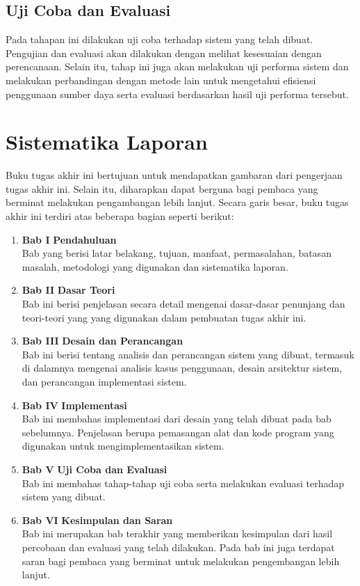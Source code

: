 \subsection{Uji Coba dan Evaluasi}
Pada tahapan ini dilakukan uji coba terhadap sistem yang telah dibuat. Pengujian dan evaluasi akan dilakukan dengan melihat kesesuaian dengan perencanaan. Selain itu, tahap ini juga akan melakukan uji performa sistem dan melakukan perbandingan dengan metode lain untuk mengetahui efisiensi penggunaan sumber daya serta evaluasi berdasarkan hasil uji performa tersebut. 

\section{Sistematika Laporan}
Buku tugas akhir ini bertujuan untuk mendapatkan gambaran dari pengerjaan tugas akhir ini. Selain itu, diharapkan dapat berguna bagi pembaca yang berminat melakukan pengambangan lebih lanjut. Secara garis besar, buku tugas akhir ini terdiri atas beberapa bagian seperti berikut:
\begin{enumerate}
	
	\item \textbf{Bab I} \indent \textbf{Pendahuluan} \\        
	\indent \indent Bab yang berisi latar belakang, tujuan, manfaat, permasalahan, batasan masalah, metodologi yang digunakan dan sistematika laporan.
	\\
	\item \textbf{Bab II} \indent \textbf{Dasar Teori}
	\\
	\indent \indent Bab ini berisi penjelasan secara detail mengenai dasar-dasar penunjang dan teori-teori yang yang digunakan dalam pembuatan tugas akhir ini.
	\\
	\item \textbf{Bab III} \indent \textbf{Desain dan Perancangan}
	\\
	\indent \indent Bab ini berisi tentang analisis dan perancangan sistem yang dibuat, termasuk di dalamnya mengenai analisis kasus penggunaan, desain arsitektur sistem, dan perancangan implementasi sistem.
	\\
	\item \textbf{Bab IV} \indent \textbf{Implementasi}
	\\
	\indent \indent Bab ini membahas implementasi dari desain yang telah dibuat pada bab sebelumnya. Penjelasan berupa pemasangan alat dan kode program yang digunakan untuk mengimplementasikan sistem.
	\\
	\item \textbf{Bab V} \indent \textbf{Uji Coba dan Evaluasi}
	\\
	\indent \indent Bab ini membahas tahap-tahap uji coba serta melakukan evaluasi terhadap sistem yang dibuat.
	\\
	\item \textbf{Bab VI} \indent \textbf{Kesimpulan dan Saran}
	\\
	\indent \indent Bab ini merupakan bab terakhir yang memberikan kesimpulan dari hasil percobaan dan evaluasi yang telah dilakukan. Pada bab ini juga terdapat saran bagi pembaca yang berminat untuk melakukan pengembangan lebih lanjut.    
\end{enumerate}